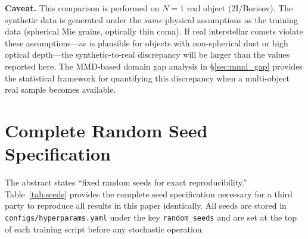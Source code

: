 \documentclass[usenatbib]{mnras}
\begin{document}
\textbf{Caveat.} This comparison is performed on $N=1$ real object (2I/Borisov). The synthetic data is generated under the \textit{same} physical assumptions as the training data (spherical Mie grains, optically thin coma). If real interstellar comets violate these assumptions---as is plausible for objects with non-spherical dust or high optical depth---the synthetic-to-real discrepancy will be larger than the values reported here. The MMD-based domain gap analysis in \S\ref{sec:mmd_gap} provides the statistical framework for quantifying this discrepancy when a multi-object real sample becomes available.

\section{Complete Random Seed Specification}\label{app:seeds}

The abstract states ``fixed random seeds for exact reproducibility.'' Table~\ref{tab:seeds} provides the complete seed specification necessary for a third party to reproduce all results in this paper identically. All seeds are stored in \texttt{configs/hyperparams.yaml} under the key \texttt{random\_seeds} and are set at the top of each training script before any stochastic operation.
\end{document}
